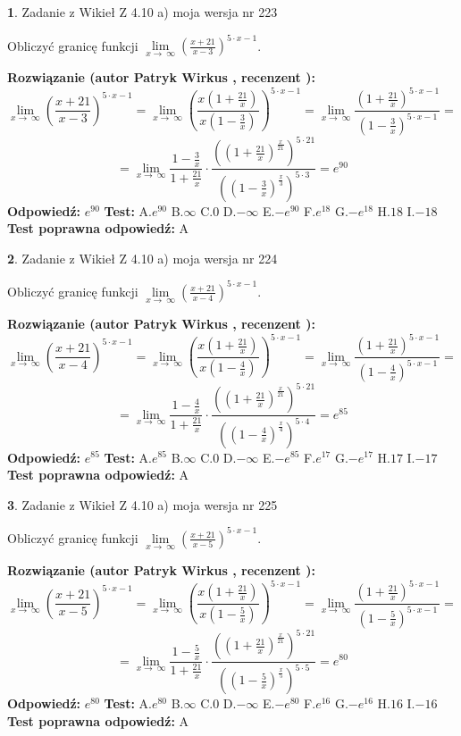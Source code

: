 \documentclass[12pt, a4paper]{article}
\theoremstyle{definition} %
\newtheorem{zad}{}
\newcommand{\zadStart}[1]{\begin{zad}#1\newline}
\newcommand{\zadStop}{\end{zad}}
\newcommand{\rozwStart}[2]{\noindent \textbf{Rozwiązanie (autor #1 , recenzent #2): }\newline}
\newcommand{\rozwStop}{\newline}
\newcommand{\odpStart}{\noindent \textbf{Odpowiedź:}\newline}
\newcommand{\odpStop}{\newline}
\newcommand{\testStart}{\noindent \textbf{Test:}\newline}
\newcommand{\testStop}{\newline}
\newcommand{\kluczStart}{\noindent \textbf{Test poprawna odpowiedź:}\newline}
\newcommand{\kluczStop}{\newline}
\begin{document}
\zadStart{Zadanie z Wikieł Z 4.10 a) moja wersja nr 223}

Obliczyć granicę funkcji  $\lim\limits_{x\to\ \infty}(\frac{x+21}{x-3})^{5\cdot x-1}$.
\zadStop
\rozwStart{Patryk Wirkus}{}
$$\lim\limits_{x\to\ \infty}(\frac{x+21}{x-3})^{5\cdot x-1} = \lim\limits_{x\to\ \infty}(\frac{x(1+\frac{21}{x})}{x(1-\frac{3}{x})})^{5\cdot x-1}=\lim\limits_{x\to\ \infty}\frac{(1+\frac{21}{x})^{5\cdot x-1}}{(1-\frac{3}{x})^{5\cdot x-1}}=$$
$$=\lim\limits_{x\to\ \infty}\frac{1-\frac{3}{x}}{1+\frac{21}{x}}\cdot\frac{((1+\frac{21}{x})^{\frac{x}{21}})^{5\cdot21}}{((1-\frac{3}{x})^{\frac{x}{3}})^{5\cdot3}}=e^{90}$$
\rozwStop
\odpStart
$e^{90}$
\odpStop
\testStart
A.$e^{90}$ B.$\infty$ C.$0$ D.$-\infty$ E.$-e^{90}$
F.$e^{18}$ G.$-e^{18}$
H.$18$
I.$-18$
\testStop
\kluczStart
A
\kluczStop



\zadStart{Zadanie z Wikieł Z 4.10 a) moja wersja nr 224}

Obliczyć granicę funkcji  $\lim\limits_{x\to\ \infty}(\frac{x+21}{x-4})^{5\cdot x-1}$.
\zadStop
\rozwStart{Patryk Wirkus}{}
$$\lim\limits_{x\to\ \infty}(\frac{x+21}{x-4})^{5\cdot x-1} = \lim\limits_{x\to\ \infty}(\frac{x(1+\frac{21}{x})}{x(1-\frac{4}{x})})^{5\cdot x-1}=\lim\limits_{x\to\ \infty}\frac{(1+\frac{21}{x})^{5\cdot x-1}}{(1-\frac{4}{x})^{5\cdot x-1}}=$$
$$=\lim\limits_{x\to\ \infty}\frac{1-\frac{4}{x}}{1+\frac{21}{x}}\cdot\frac{((1+\frac{21}{x})^{\frac{x}{21}})^{5\cdot21}}{((1-\frac{4}{x})^{\frac{x}{4}})^{5\cdot4}}=e^{85}$$
\rozwStop
\odpStart
$e^{85}$
\odpStop
\testStart
A.$e^{85}$ B.$\infty$ C.$0$ D.$-\infty$ E.$-e^{85}$
F.$e^{17}$ G.$-e^{17}$
H.$17$
I.$-17$
\testStop
\kluczStart
A
\kluczStop



\zadStart{Zadanie z Wikieł Z 4.10 a) moja wersja nr 225}

Obliczyć granicę funkcji  $\lim\limits_{x\to\ \infty}(\frac{x+21}{x-5})^{5\cdot x-1}$.
\zadStop
\rozwStart{Patryk Wirkus}{}
$$\lim\limits_{x\to\ \infty}(\frac{x+21}{x-5})^{5\cdot x-1} = \lim\limits_{x\to\ \infty}(\frac{x(1+\frac{21}{x})}{x(1-\frac{5}{x})})^{5\cdot x-1}=\lim\limits_{x\to\ \infty}\frac{(1+\frac{21}{x})^{5\cdot x-1}}{(1-\frac{5}{x})^{5\cdot x-1}}=$$
$$=\lim\limits_{x\to\ \infty}\frac{1-\frac{5}{x}}{1+\frac{21}{x}}\cdot\frac{((1+\frac{21}{x})^{\frac{x}{21}})^{5\cdot21}}{((1-\frac{5}{x})^{\frac{x}{5}})^{5\cdot5}}=e^{80}$$
\rozwStop
\odpStart
$e^{80}$
\odpStop
\testStart
A.$e^{80}$ B.$\infty$ C.$0$ D.$-\infty$ E.$-e^{80}$
F.$e^{16}$ G.$-e^{16}$
H.$16$
I.$-16$
\testStop
\kluczStart
A
\kluczStop
\end{document}
